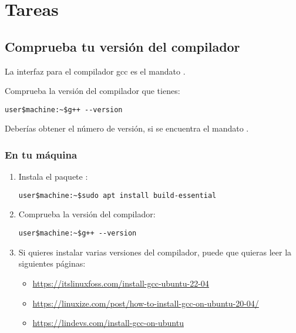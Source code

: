\section{Tareas}

\subsection{Comprueba tu versión del compilador}

La interfaz para el compilador gcc es el mandato .

Comprueba la versión del compilador que tienes:

\begin{lstlisting}[style=terminal]
user$machine:~$g++ --version
\end{lstlisting}

Deberías obtener el número de versión, si se encuentra el mandato .

\subsubsection{En tu máquina}

\begin{enumerate}

\item Instala el paquete :

\begin{lstlisting}[style=terminal]
user$machine:~$sudo apt install build-essential
\end{lstlisting}

\item Comprueba la versión del compilador:

\begin{lstlisting}[style=terminal]
user$machine:~$g++ --version
\end{lstlisting}

\item Si quieres instalar varias versiones del compilador,
      puede que quieras leer la siguientes páginas:
  \begin{itemize}
    \item \url{https://itslinuxfoss.com/install-gcc-ubuntu-22-04}
    \item \url{https://linuxize.com/post/how-to-install-gcc-on-ubuntu-20-04/}
    \item \url{https://lindevs.com/install-gcc-on-ubuntu}
  \end{itemize}
\end{enumerate}

